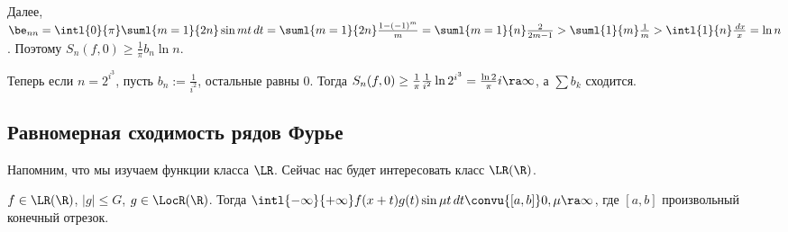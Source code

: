 \documentclass[a4paper]{article}
\newcommand{\intlop}{\intl{0}{\pi}}
\newcommand{\intlii}{\intl{-\infty}{+\infty}}
\newcommand{\frpi}{\frac{1}{\pi}}
\begin{document}
Далее, $\be_{nn} = \intlop \suml{m=1}{2n}\sin mt \,d t = \suml{m=1}{2n}\frac{1-(-1)^m}{m} =
\suml{m=1}{n} \frac{2}{2m-1} > \suml{1}{m}\frac{1}{m} > \intl{1}{n}\frac{\,d x}{x} = \ln n$.
Поэтому $S_n(f,0) \ge \frpi b_n\ln n$.

Теперь если $n = 2^{i^3}$, пусть $b_n := \frac{1}{i^2}$, остальные равны 0. Тогда $S_n(f,0) \ge \frpi \frac{1}{i^2}\ln 2^{i^3} =
\frac{\ln 2}{\pi} i \ra \infty$, а $\sum b_k$ сходится.

\subsection{Равномерная сходимость рядов Фурье}

Напомним, что мы изучаем функции класса $\LR$. Сейчас нас будет интересовать класс $\LR(\R)$.
\begin{theorem}[ОЛР]
$f \in\LR(\R)$, $|g| \le G$, $g \in\LocR(\R)$. Тогда $\intlii f(x+t)g(t)\sin \mu t \,d t
\convu{[a,b]} 0, \mu \ra \infty$, где $[a,b]$ произвольный конечный отрезок.
\end{theorem}
\end{document}

